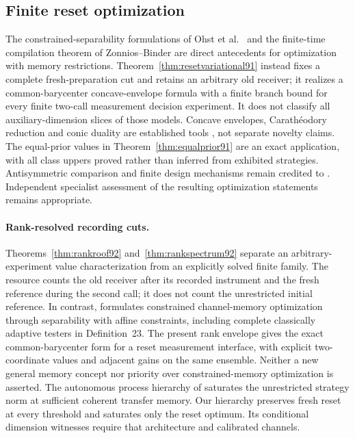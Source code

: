\subsection{Finite reset optimization}
The constrained-separability formulations of Ohst et al.\ \cite{OZNPQ89}
and the finite-time compilation theorem of Zonnios--Binder
\cite{ZB90} are direct antecedents for optimization with memory
restrictions.  Theorem~\ref{thm:resetvariational91} instead fixes a
complete fresh-preparation cut and retains an arbitrary old receiver;
it realizes a common-barycenter concave-envelope formula with a finite
branch bound for every finite two-call measurement decision experiment.
It does not classify all auxiliary-dimension slices of those models.
Concave envelopes, Carath\'eodory reduction and conic duality are
established tools \cite{Uhlmann91,BV91}, not separate novelty claims.
The equal-prior values in Theorem~\ref{thm:equalprior91} are an exact
application, with all class uppers proved rather than inferred from
exhibited strategies.  Antisymmetric comparison and finite design
mechanisms remain credited to \cite{ZHS90,GAE90}.  Independent specialist
assessment of the resulting optimization statements remains appropriate.


\paragraph{Rank-resolved recording cuts.}
Theorems~\ref{thm:rankroof92} and~\ref{thm:rankspectrum92} separate
an arbitrary-experiment value characterization from an explicitly
solved finite family.  The resource counts the old receiver after its
recorded instrument and the fresh reference during the second call;
it does not count the unrestricted initial reference.  In contrast,
\cite[Sections~5--6]{OZNPQ89} formulates constrained channel-memory
optimization through separability with affine constraints, including
complete classically adaptive testers in Definition~23.
The present rank envelope gives the exact common-barycenter form for
a reset measurement interface, with explicit two-coordinate values
and adjacent gains on the same ensemble.  Neither a new general
memory concept nor priority over constrained-memory optimization is
asserted.  The autonomous process hierarchy of
\cite[Theorem~1 and Corollary~1]{ZB90} saturates the unrestricted
strategy norm at sufficient coherent transfer memory.  Our hierarchy
preserves fresh reset at every threshold and saturates only the
reset optimum.  Its conditional dimension witnesses require that
architecture and calibrated channels.

